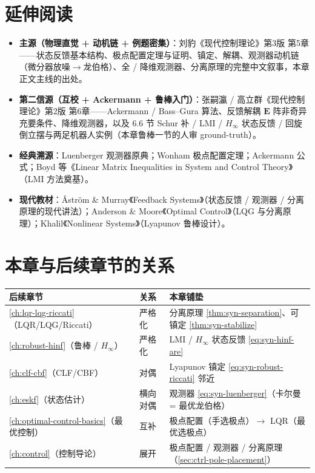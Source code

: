 \section*{延伸阅读}
\begin{itemize}
  \item \textbf{主源（物理直觉 + 动机链 + 例题密集）}：刘豹《现代控制理论》第3版\cite{liubao2006modern} 第5章——状态反馈基本结构、极点配置定理与证明、镇定、解耦、观测器动机链（微分器放噪$\to$龙伯格）、全 / 降维观测器、分离原理的完整中文叙事，本章正文主线的出处。
  \item \textbf{第二信源（互校 + Ackermann + 鲁棒入门）}：张嗣瀛 / 高立群《现代控制理论》第2版\cite{zhang2017modern} 第6章——Ackermann / Bass--Gura 算法、反馈解耦 $\mathbf E$ 阵非奇异充要条件、降维观测器，以及 6.6 节 Schur 补 / LMI / $H_\infty$ 状态反馈 / 回旋倒立摆与两足机器人实例（本章鲁棒一节的人审 ground-truth）。
  \item \textbf{经典溯源}：Luenberger 观测器原典\cite{luenberger1971introduction}；Wonham 极点配置定理\cite{wonham1967pole}；Ackermann 公式\cite{ackermann1972der}；Boyd 等《Linear Matrix Inequalities in System and Control Theory》\cite{boyd1994linear}（LMI 方法奠基）。
  \item \textbf{现代教材}：Åström \& Murray《Feedback Systems》\cite{astrom2008feedback}（状态反馈 / 观测器 / 分离原理的现代讲法）；Anderson \& Moore《Optimal Control》\cite{anderson2007optimal}（LQG 与分离原理）；Khalil《Nonlinear Systems》\cite{khalil2002nonlinear}（Lyapunov 鲁棒设计）。
\end{itemize}

\section*{本章与后续章节的关系}
\begin{table}[H]\centering\small
\begin{tabular}{lll}
\toprule
后续章节 & 关系 & 本章铺垫 \\
\midrule
\cref{ch:lqr-lqg-riccati}（LQR/LQG/Riccati）& 严格化 & 分离原理 \cref{thm:syn-separation}、可镇定 \cref{thm:syn-stabilize} \\
\cref{ch:robust-hinf}（鲁棒 / $H_\infty$）& 严格化 & LMI / $H_\infty$ 状态反馈 \cref{eq:syn-hinf-are} \\
\cref{ch:clf-cbf}（CLF/CBF）& 对偶 & Lyapunov 镇定 \cref{eq:syn-robust-riccati} 邻近 \\
\cref{ch:eskf}（状态估计）& 横向对偶 & 观测器 \cref{eq:syn-luenberger}（卡尔曼 = 最优龙伯格） \\
\cref{ch:optimal-control-basics}（最优控制）& 互补 & 极点配置（手选极点）$\to$ LQR（最优选极点） \\
\cref{ch:control}（控制导论）& 展开 & 极点配置 / 观测器 / 分离原理（\cref{sec:ctrl-pole-placement}） \\
\bottomrule
\end{tabular}
\end{table}

